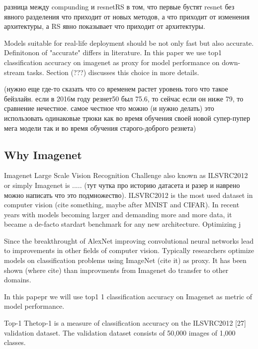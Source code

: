 разница между compunding и resnetRS в том, что первые бустят resnet без явного разделения что приходит от новых методов, а что приходит от изменения архитектуры, а RS явно показывает что приходит от архитектуры. 


Models suitable for real-life deployment should be not only fast but also accurate. Definitonon of "accurate" differs in literature. In this paper we use top1 classification accuracy on imagenet as proxy for model performance on down-stream tasks. Section (???) discusses this choice in more details.



(нужно еще где-то сказать что со временем растет уровень того что такое бейзлайн. если в 2016м году резнет50 был 75.6, то сейчас если он ниже 79, то сравнение нечестное. самое честное что можно (и нужно делать) это использовать одинаковые трюки как во время обучения своей новой супер-пупер мега модели так и во время обучения старого-доброго резнета)

\subsection{Why Imagenet}

Imagenet Large Scale Vision Recognition Challenge also known as ILSVRC2012 or simply Imagenet is ..... (тут чутка про историю датасета и разер и наврено можно написать что это подмножество). ILSVRC2012 is the most used dataset in computer vision (cite something, maybe after MNIST and CIFAR). In recent years with models becoming larger and demanding more and more data, it became a de-facto stardart benchmark for any new architecture. Optimizing j

Since the breakthrought of AlexNet improving convolutional neural networks lead to improvements in other fields of computer vision. Typically researchers optimize models on classification problems using ImageNet (cite it) as proxy. It has been shown (where cite) than improvments from Imagenet do transfer to other domains.  

In this papepr we will use top1 1 classification accuracy on Imagenet as metric of model performance. 

Top-1 Thetop-1 is a measure of classification accuracy on the ILSVRC2012 [27] validation dataset. The validation dataset consists of 50,000 images of 1,000 classes.

